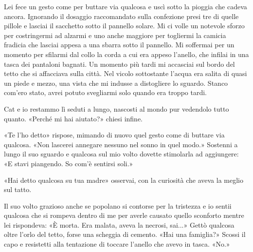 Lei fece un gesto come per buttare via qualcosa e uscì sotto la pioggia
che cadeva ancora. Ignorando il dosaggio raccomandato sulla confezione
presi tre di quelle pillole e lasciai il sacchetto sotto il pannello
solare. Mi ci volle un notevole sforzo per costringermi ad alzarmi e uno
anche maggiore per togliermi la camicia fradicia che lasciai appesa a
una sbarra sotto il pannello. Mi soffermai per un momento per sfilarmi
dal collo la corda a cui era appeso l'anello, che infilai in una tasca
dei pantaloni bagnati. Un momento più tardi mi accasciai sul bordo del
tetto che si affacciava sulla città. Nel vicolo sottostante l'acqua era
salita di quasi un piede e mezzo, una vista che mi indusse a distogliere
lo sguardo. Stanco com'ero stato, avrei potuto svegliarmi solo quando
era troppo tardi.

Cat e io restammo lì seduti a lungo, nascosti al mondo pur vedendolo
tutto quanto. «Perché mi hai aiutato?» chiesi infine.

«Te l'ho detto» rispose, mimando di nuovo quel gesto come di buttare via
qualcosa. «Non lascerei annegare nessuno nel sonno in quel modo.»
Sostenni a lungo il suo sguardo e qualcosa sul mio volto dovette
stimolarla ad aggiungere: «E stavi piangendo. So com'è sentirsi soli.»

«Hai detto qualcosa su tua madre» osservai, con la curiosità che aveva
la meglio sul tatto.

Il suo volto grazioso anche se popolano si contorse per la tristezza e
io sentii qualcosa che si rompeva dentro di me per averle causato quello
sconforto mentre lei rispondeva: «È morta. Era malata, aveva la necrosi,
sai...» Gettò qualcosa oltre l'orlo del tetto, forse una scheggia di
cemento. «Hai una famiglia?» Scossi il capo e resistetti alla tentazione
di toccare l'anello che avevo in tasca. «No.»


